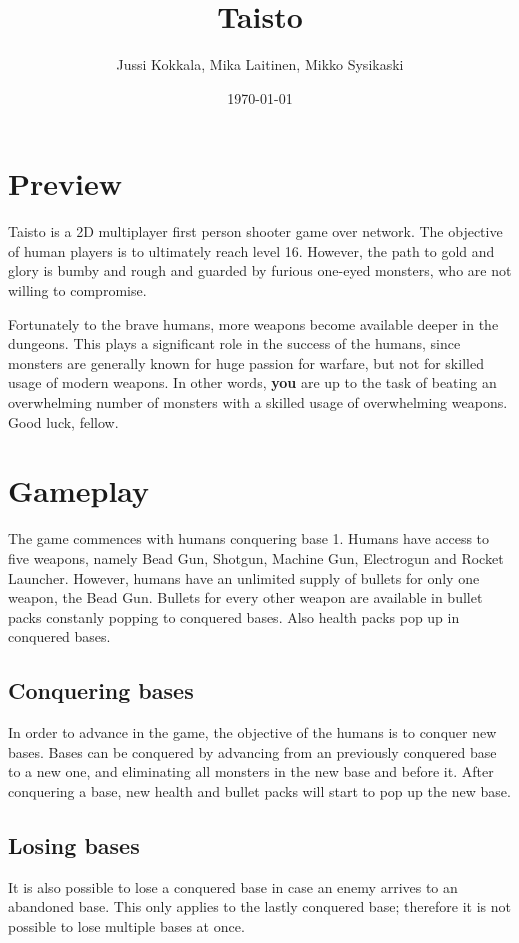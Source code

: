 \documentclass[a4paper,11pt]{article}
\title{Taisto}
\author{Jussi Kokkala, Mika Laitinen, Mikko Sysikaski}
\date{\today}
\begin{document}
\maketitle
\section*{Preview}
Taisto is a 2D multiplayer first person shooter game over network. The objective of human players is to ultimately reach level 16. However, the path to gold and glory is bumby and rough and guarded by furious one-eyed monsters, who are not willing to compromise. 

Fortunately to the brave humans, more weapons become available deeper in the dungeons. This plays a significant role in the success of the humans, since monsters are generally known for huge passion for warfare, but not for skilled usage of modern weapons. In other words, \textbf{you} are up to the task of beating an overwhelming number of monsters with a skilled usage of overwhelming weapons. Good luck, fellow.

\section*{Gameplay}
The game commences with humans conquering base 1. Humans have access to five weapons, namely Bead Gun, Shotgun, Machine Gun, Electrogun and Rocket Launcher. However, humans have an unlimited supply of bullets for only one weapon, the Bead Gun. Bullets for every other weapon are available in bullet packs constanly popping to conquered bases. Also health packs pop up in conquered bases.

\subsection*{Conquering bases}
In order to advance in the game, the objective of the humans is to conquer new bases. Bases can be conquered by advancing from an previously conquered base to a new one, and eliminating all monsters in the new base and before it. After conquering a base, new health and bullet packs will start to pop up the new base.

\subsection*{Losing bases}
It is also possible to lose a conquered base in case an enemy arrives to an abandoned base. This only applies to the lastly conquered base; therefore it is not possible to lose multiple bases at once.
\end{document}
